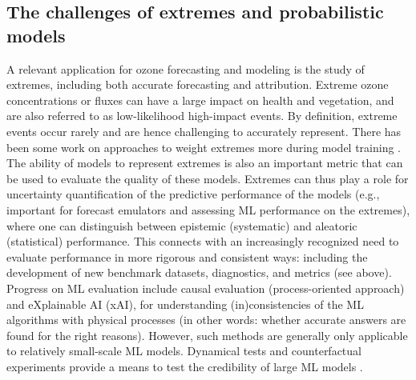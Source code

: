 \documentclass[gmd, manuscript]{copernicus}
\begin{document}
\subsection{The challenges of extremes and probabilistic models}

A relevant application for ozone forecasting and modeling is the study of extremes, including both accurate forecasting and attribution. Extreme ozone concentrations or fluxes can have a large impact on health and vegetation, and are also referred to as low-likelihood high-impact events. By definition, extreme events occur rarely and are hence challenging to accurately represent. There has been some work on approaches to weight extremes more during model training \citep{Steininger2021}. The ability of models to represent extremes is also an important metric that can be used to evaluate the quality of these models. Extremes can thus play a role for uncertainty quantification of the predictive performance of the models (e.g., important for forecast emulators and assessing ML performance on the extremes), where one can distinguish between epistemic (systematic) and aleatoric (statistical) performance. This connects with an increasingly recognized need to evaluate performance in more rigorous and consistent ways: including the development of new benchmark datasets, diagnostics, and metrics (see above). Progress on ML evaluation include causal evaluation (process-oriented approach) and eXplainable AI (xAI), for understanding (in)consistencies of the ML algorithms with physical processes (in other words: whether accurate answers are found for the right reasons). However, such methods are generally only applicable to relatively small-scale ML models. Dynamical tests and counterfactual experiments provide a means to test the credibility of large ML models \citep{Hakim2024, bano-medina_are_2024}.
\end{document}
